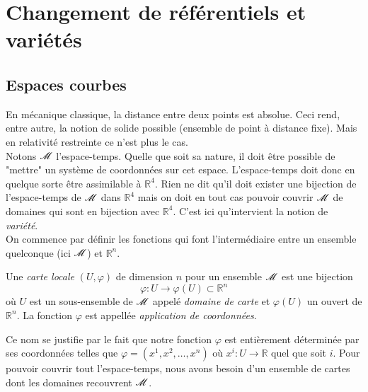 \documentclass[a4paper,11pt]{report}
\begin{document}
    \section{Changement de référentiels et variétés}
    
        \subsection{Espaces courbes}
        
            En mécanique classique, la distance entre deux points est absolue. Ceci rend, entre autre, la notion de solide possible (ensemble de point à distance fixe). Mais en relativité restreinte ce n'est plus le cas. \\
            
            Notons $\mathscr{M}$ l'espace-temps. Quelle que soit sa nature, il doit être possible de "mettre" un système de coordonnées sur cet espace. L'espace-temps doit donc en quelque sorte être assimilable à $\mathbb{R}^4$. Rien ne dit qu'il doit exister une bijection de l'espace-temps de $\mathscr{M}$ dans $\mathbb{R}^4$ mais on doit en tout cas pouvoir couvrir $\mathscr{M}$ de domaines qui sont en bijection avec $\mathbb{R}^4$. C'est ici qu'intervient la notion de \textit{variété}.\\
            
            On commence par définir les fonctions qui font l'intermédiaire entre un ensemble quelconque (ici $\mathscr{M}$) et $\mathbb{R}^n$.
            \begin{definition}
                Une \textit{carte locale} $(U,\varphi)$ de dimension $n$ pour un ensemble $\mathscr{M}$ est une bijection
                \begin{equation}
                    \varphi:U\to\varphi(U) \subset\mathbb{R}^n
                \end{equation}
                où $U$ est un sous-ensemble de $\mathscr{M}$ appelé \textit{domaine de carte} et $\varphi(U)$ un ouvert de $\mathbb{R}^n$. La fonction $\varphi$ est appellée \textit{application de coordonnées}.
            \end{definition}
            
            Ce nom se justifie par le fait que notre fonction $\varphi$ est entièrement déterminée par ses coordonnées telles que $\varphi = (x^1, x^2, \ldots, x^n)$ où $x^i: U \to \mathbb{R}$ quel que soit $i$. Pour pouvoir couvrir tout l'espace-temps, nous avons besoin d'un ensemble de cartes dont les domaines recouvrent $\mathscr{M}$.
            
\end{document}
